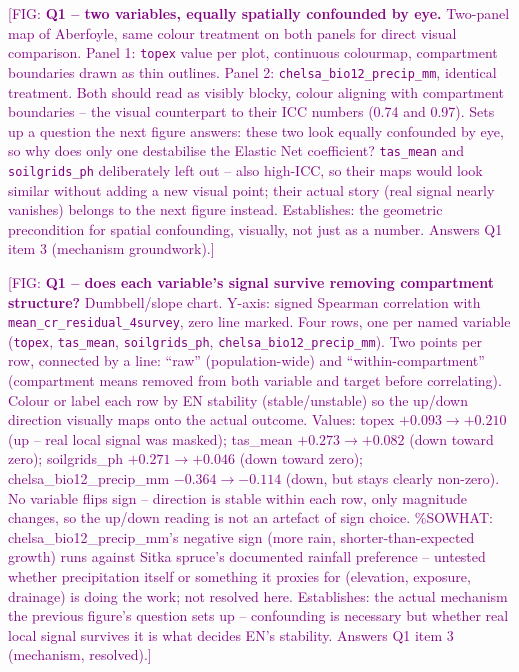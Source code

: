 \documentclass[logo,msc,ai]{infthesis}           %
\newcommand{\fig}[1]{\textcolor{purple}{[FIG: #1]}}
\begin{document}
\fig{\textbf{Q1 -- two variables, equally spatially confounded by eye.} Two-panel map
of Aberfoyle, same colour treatment on both panels for direct visual comparison.
Panel 1: \texttt{topex} value per plot, continuous colourmap, compartment boundaries
drawn as thin outlines. Panel 2: \texttt{chelsa\_bio12\_precip\_mm}, identical
treatment. Both should read as visibly blocky, colour aligning with compartment
boundaries -- the visual counterpart to their ICC numbers (0.74 and 0.97). Sets up a
question the next figure answers: these two look equally confounded by eye, so why
does only one destabilise the Elastic Net coefficient? \texttt{tas\_mean} and
\texttt{soilgrids\_ph} deliberately left out -- also high-ICC, so their maps would
look similar without adding a new visual point; their actual story (real signal
nearly vanishes) belongs to the next figure instead. Establishes: the geometric
precondition for spatial confounding, visually, not just as a number. Answers Q1
item 3 (mechanism groundwork).}

\fig{\textbf{Q1 -- does each variable's signal survive removing compartment
structure?} Dumbbell/slope chart. Y-axis: signed Spearman correlation with
\texttt{mean\_cr\_residual\_4survey}, zero line marked. Four rows, one per named
variable (\texttt{topex}, \texttt{tas\_mean}, \texttt{soilgrids\_ph},
\texttt{chelsa\_bio12\_precip\_mm}). Two points per row, connected by a line:
``raw'' (population-wide) and ``within-compartment'' (compartment means removed
from both variable and target before correlating). Colour or label each row by EN
stability (stable/unstable) so the up/down direction visually maps onto the actual
outcome. Values: topex $+0.093\to+0.210$ (up -- real local signal was masked);
tas\_mean $+0.273\to+0.082$ (down toward zero); soilgrids\_ph
$+0.271\to+0.046$ (down toward zero); chelsa\_bio12\_precip\_mm
$-0.364\to-0.114$ (down, but stays clearly non-zero). No variable flips sign --
direction is stable within each row, only magnitude changes, so the up/down
reading is not an artefact of sign choice. \%SOWHAT: chelsa\_bio12\_precip\_mm's
negative sign (more rain, shorter-than-expected growth) runs against Sitka
spruce's documented rainfall preference -- untested whether precipitation itself
or something it proxies for (elevation, exposure, drainage) is doing the work; not
resolved here. Establishes: the actual mechanism the previous figure's question
sets up -- confounding is necessary but whether real local signal survives it is
what decides EN's stability. Answers Q1 item 3 (mechanism, resolved).}
\end{document}
